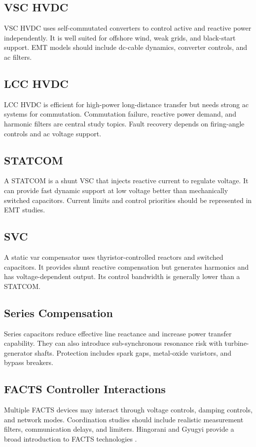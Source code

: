 \documentclass[11pt]{article}
\begin{document}
\subsection{VSC HVDC}
VSC HVDC uses self-commutated converters to control active and reactive power independently. It is well suited for offshore wind, weak grids, and black-start support. EMT models should include dc-cable dynamics, converter controls, and ac filters.

\subsection{LCC HVDC}
LCC HVDC is efficient for high-power long-distance transfer but needs strong ac systems for commutation. Commutation failure, reactive power demand, and harmonic filters are central study topics. Fault recovery depends on firing-angle controls and ac voltage support.

\subsection{STATCOM}
A STATCOM is a shunt VSC that injects reactive current to regulate voltage. It can provide fast dynamic support at low voltage better than mechanically switched capacitors. Current limits and control priorities should be represented in EMT studies.

\subsection{SVC}
A static var compensator uses thyristor-controlled reactors and switched capacitors. It provides shunt reactive compensation but generates harmonics and has voltage-dependent output. Its control bandwidth is generally lower than a STATCOM.

\subsection{Series Compensation}
Series capacitors reduce effective line reactance and increase power transfer capability. They can also introduce sub-synchronous resonance risk with turbine-generator shafts. Protection includes spark gaps, metal-oxide varistors, and bypass breakers.

\subsection{FACTS Controller Interactions}
Multiple FACTS devices may interact through voltage controls, damping controls, and network modes. Coordination studies should include realistic measurement filters, communication delays, and limiters. Hingorani and Gyugyi provide a broad introduction to FACTS technologies \cite{hingorani2000}.
\end{document}
